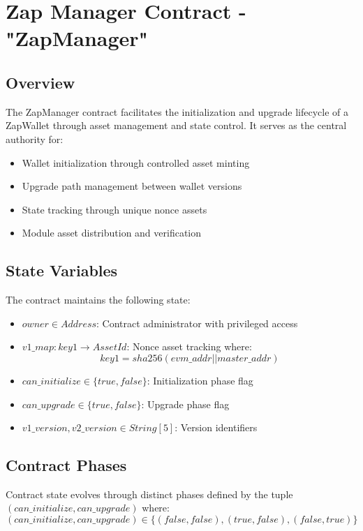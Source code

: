 \newpage
\section{Zap Manager Contract - {\ttfamily "ZapManager"}}
\label{sec:zapmanager_contract}


\subsection{Overview}
The ZapManager contract facilitates the initialization and upgrade lifecycle of a ZapWallet through asset management and state control. It serves as the central authority for:

\begin{itemize}
    \item Wallet initialization through controlled asset minting
    \item Upgrade path management between wallet versions
    \item State tracking through unique nonce assets
    \item Module asset distribution and verification
\end{itemize}

\subsection{State Variables}
The contract maintains the following state:

\begin{itemize}
    \item $owner \in Address$: Contract administrator with privileged access
    \item $v1\_map: key1 \rightarrow AssetId$: Nonce asset tracking where:
        \[ key1 = sha256(evm\_addr || master\_addr) \]
    \item $can\_initialize \in \{true, false\}$: Initialization phase flag
    \item $can\_upgrade \in \{true, false\}$: Upgrade phase flag
    \item $v1\_version, v2\_version \in String[5]$: Version identifiers
\end{itemize}

\subsection{Contract Phases}
Contract state evolves through distinct phases defined by the tuple $(can\_initialize, can\_upgrade)$ where:
\[ (can\_initialize, can\_upgrade) \in \{(false,false), (true,false), (false,true)\} \]

